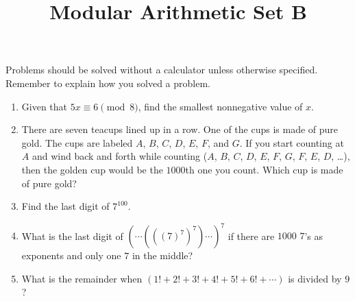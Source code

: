 \documentclass{article}
\title{Modular Arithmetic Set B}
\date{}
\author{}
\begin{document}
\maketitle
\noindent Problems should be solved without a calculator unless otherwise specified.
Remember to explain how you solved a problem.
\begin{multicols}{2}
    \raggedcolumns
    \begin{enumerate}
        \item Given that $5x \equiv 6 \pmod 8$, find the smallest nonnegative value of $x$.
            \vspace{3cm}
        \item There are seven teacups lined up in a row.
            One of the cups is made of pure gold.
            The cups are labeled $A$, $B$, $C$, $D$, $E$, $F$, and $G$.
            If you start counting at $A$ and wind back and forth while counting ($A$, $B$, $C$, $D$, $E$, $F$, $G$, $F$, $E$, $D$, \dots), then the golden cup would be the $1000$th one you count.
            Which cup is made of pure gold?
            \vspace{3cm}
        \item Find the last digit of $7^{100}$.
            \vspace{3cm}
        \item What is the last digit of $(\cdots(((7)^7)^7)\cdots)^7$ if there are $1000$ $7$'s as exponents and only one $7$ in the middle?
            \vspace{3cm}
        \item What is the remainder when $(1! + 2! + 3! + 4! + 5! + 6! + \cdots)$ is divided by $9$?
            \vspace{3cm}
    \end{enumerate}
\end{multicols}
\end{document}
